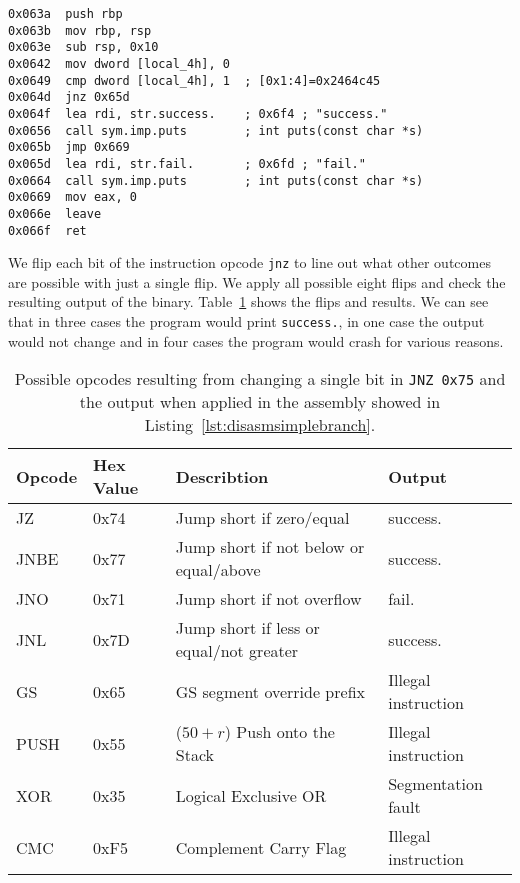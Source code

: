 \begin{minipage}{\linewidth}
\begin{lstlisting}[style=nasm,
                   caption={Disassemby of the main function created by the
code in Listing~\ref{lst:csimbranch}. Shows machine code at given address
inside the ELF file, starting at \texttt{0x063a}.},
                   label={lst:disasmsimplebranch}]
0x063a  push rbp
0x063b  mov rbp, rsp
0x063e  sub rsp, 0x10
0x0642  mov dword [local_4h], 0
0x0649  cmp dword [local_4h], 1  ; [0x1:4]=0x2464c45
0x064d  jnz 0x65d
0x064f  lea rdi, str.success.    ; 0x6f4 ; "success."
0x0656  call sym.imp.puts        ; int puts(const char *s)
0x065b  jmp 0x669
0x065d  lea rdi, str.fail.       ; 0x6fd ; "fail."
0x0664  call sym.imp.puts        ; int puts(const char *s)
0x0669  mov eax, 0
0x066e  leave
0x066f  ret
\end{lstlisting}
\end{minipage}

We flip each bit of the instruction opcode \texttt{jnz} to line out what other
outcomes are possible with just a single flip. We apply all possible eight
flips and check the resulting output of the binary. Table~\ref{tab:jnzflips}
shows the flips and results. We can see that in three cases the program would
print \texttt{success.}, in one case the output would not change and in four
cases the program would crash for various reasons.

\begin{table}[]
\centering
\begin{tabular}{|l|l|l|l|}
\hline
Opcode & Hex Value & Describtion                                           &
Output              \\ \hline
JZ     & 0x74      & Jump short if zero/equal                              &
success.            \\ \hline
JNBE   & 0x77      & Jump short if not below or equal/above                &
success.            \\ \hline
JNO    & 0x71      & Jump short if not overflow                            &
fail.               \\ \hline
JNL    & 0x7D      & Jump short if less or equal/not greater               &
success.            \\ \hline
GS     & 0x65      & GS segment override prefix                            &
Illegal instruction \\ \hline
PUSH   & 0x55      & ($50+r$) Push onto the Stack &
Illegal instruction \\ \hline
XOR    & 0x35      & Logical Exclusive OR                                  &
Segmentation fault  \\ \hline
CMC    & 0xF5      & Complement Carry Flag                                 &
Illegal instruction \\ \hline
\end{tabular}
\caption{Possible opcodes resulting from changing a single bit in
\texttt{JNZ}~\texttt{0x75} and the output when applied in the assembly showed in
Listing~\ref{lst:disasmsimplebranch}.}
\label{tab:jnzflips}
\end{table}

